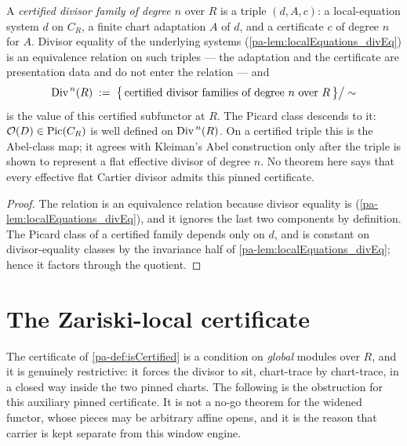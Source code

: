 \begin{definition}
  \label{pa-def:certifiedDivisorFamily}
  \leanok

  A \emph{certified divisor family of degree \(n\)} over \(R\) is a triple \((d, A, c)\):
  a local-equation system \(d\) on \(C_R\), a finite chart adaptation \(A\) of \(d\), and a
  certificate \(c\) of degree \(n\) for \(A\). Divisor equality of the underlying systems
  (\ref{pa-lem:localEquations_divEq}) is an equivalence relation on such triples --- the
  adaptation and the certificate are presentation data and do not enter the relation ---
  and
  \[
    \operatorname{Div}^{\,n}(R) \;:=\; \bigl\{\,\text{certified divisor families of degree }n\text{ over }
      R\,\bigr\} \big/ \sim
  \]
  is the value of this certified subfunctor at \(R\). The Picard class descends to it:
  \(\mathcal{O}(D) \in \operatorname{Pic}(C_R)\) is well defined on \(\operatorname{Div}^{\,n}(R)\).  On a certified
  triple this is the Abel-class map; it agrees with Kleiman's Abel construction only after
  the triple is shown to represent a flat effective divisor of degree \(n\).  No theorem here
  says that every effective flat Cartier divisor admits this pinned certificate.
\end{definition}
\begin{proof}
  \leanok
  The relation is an equivalence relation because divisor equality is
  (\ref{pa-lem:localEquations_divEq}), and it ignores the last two components by definition.
  The Picard class of a certified family depends only on \(d\), and is constant on
  divisor-equality classes by the invariance half of \ref{pa-lem:localEquations_divEq}; hence
  it factors through the quotient.
\end{proof}

\section{The Zariski-local certificate}
\label{pa-sec:divfamzar}

The certificate of \ref{pa-def:isCertified} is a condition on \emph{global} modules over
\(R\), and it is genuinely restrictive: it forces the divisor to sit, chart-trace by
chart-trace, in a closed way inside the two pinned charts.  The following is the obstruction
for this auxiliary pinned certificate.  It is not a no-go theorem for the widened functor,
whose pieces may be arbitrary affine opens, and it is the reason that carrier is kept
separate from this window engine.


